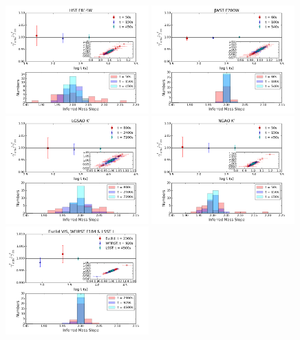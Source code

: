\documentclass[a4paper,11pt]{article}
\begin{document}
\begin{figure}
\begin{center}
\includegraphics[width=0.49\textwidth]{figures/gamma_hist_0330anti_4QSO_HST.png}
\includegraphics[width=0.49\textwidth]{figures/gamma_hist_0330anti_4QSO_JWST.png} \\
\includegraphics[width=0.49\textwidth]{figures/gamma_hist_0330anti_4QSO_Keck.png}
\includegraphics[width=0.49\textwidth]{figures/gamma_hist_0330anti_4QSO_NGAO.png} \\
\includegraphics[width=0.49\textwidth]{figures/gamma_hist_0330anti_4QSO_EWL.png}

\end{center}
\end{figure}
\end{document}
